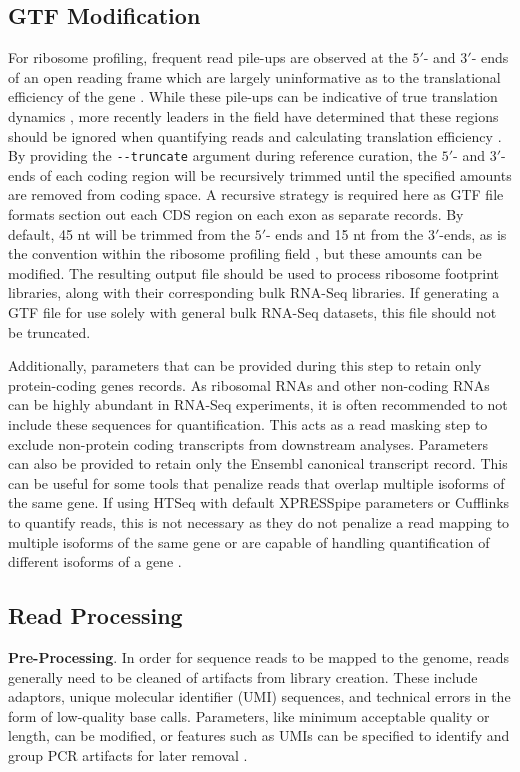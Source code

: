 \documentclass[10pt, oneside]{article}
\begin{document}
\subsection*{GTF Modification}
For ribosome profiling, frequent read pile-ups are observed at the $5'$- and $3'$- ends of an open reading frame which are largely uninformative as to the translational efficiency of the gene \cite{gerashchenko_nar}. While these pile-ups can be indicative of true translation dynamics \cite{tuller_alt}, more recently leaders in the field have determined that these regions should be ignored when quantifying reads and calculating translation efficiency \cite{ingolia_meth, weinberg_reports}. By providing the \texttt{-{}-truncate} argument during reference curation, the $5'$- and $3'$- ends of each coding region will be recursively trimmed until the specified amounts are removed from coding space. A recursive strategy is required here as GTF file formats section out each CDS region on each exon as separate records. By default, 45 nt will be trimmed from the $5'$- ends and 15 nt from the $3'$-ends, as is the convention within the ribosome profiling field \cite{ingolia_meth}, but these amounts can be modified. The resulting output file should be used to process ribosome footprint libraries, along with their corresponding bulk RNA-Seq libraries. If generating a GTF file for use solely with general bulk RNA-Seq datasets, this file should not be truncated.\par

Additionally, parameters that can be provided during this step to retain only protein-coding genes records. As ribosomal RNAs and other non-coding RNAs can be highly abundant in RNA-Seq experiments, it is often recommended to not include these sequences for quantification. This acts as a read masking step to exclude non-protein coding transcripts from downstream analyses. Parameters can also be provided to retain only the Ensembl canonical transcript record. This can be useful for some tools that penalize reads that overlap multiple isoforms of the same gene. If using HTSeq with default XPRESSpipe parameters or Cufflinks to quantify reads, this is not necessary as they do not penalize a read mapping to multiple isoforms of the same gene or are capable of handling quantification of different isoforms of a gene \cite{htseq, cufflinks}.\\

\subsection*{Read Processing}
\textbf{Pre-Processing}. In order for sequence reads to be mapped to the genome, reads generally need to be cleaned of artifacts from library creation. These include adaptors, unique molecular identifier (UMI) sequences, and technical errors in the form of low-quality base calls. Parameters, like minimum acceptable quality or length, can be modified, or features such as UMIs can be specified to identify and group PCR artifacts for later removal \cite{umi, umitools}.\par
\end{document}
